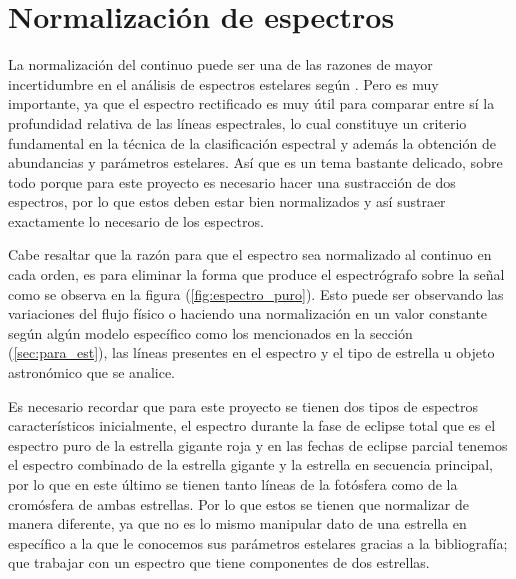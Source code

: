 \documentclass[12pt,oneside,openany,letter]{book}
\begin{document}
\section{Normalización de espectros}\label{sec:normalizacion}

\noindent La normalización del continuo puede ser una de las razones de mayor incertidumbre en el análisis de espectros estelares según \citep{jofre2017gaia}. Pero es muy importante, ya que el espectro rectificado es muy útil para comparar entre sí la profundidad relativa de las líneas espectrales, lo cual constituye un criterio fundamental en la técnica de la clasificación
espectral y además la obtención de abundancias y parámetros estelares. Así que es un tema bastante delicado, sobre todo porque para este proyecto es necesario hacer una sustracción de dos espectros, por lo que estos deben estar bien normalizados y así sustraer exactamente lo necesario de los espectros.
\vspace{2mm}

Cabe resaltar que la razón para que el espectro sea normalizado al continuo en cada orden, es para eliminar la forma que produce el espectrógrafo sobre la señal como se observa en la figura (\ref{fig:espectro_puro}). Esto puede ser observando las variaciones del flujo físico o haciendo una normalización en un valor constante según algún modelo específico como los mencionados en la sección (\ref{sec:para_est}), las líneas presentes en el espectro y el tipo de estrella u objeto astronómico que se analice.


\noindent Es necesario recordar que para este proyecto se tienen dos tipos de espectros característicos inicialmente, el espectro durante la fase de eclipse total que es el espectro puro de la estrella gigante roja y en las fechas de eclipse parcial tenemos el espectro combinado de la estrella gigante y la estrella en secuencia principal, por lo que en este último se tienen tanto líneas de la fotósfera como de la cromósfera de ambas estrellas. Por lo que estos se tienen que normalizar de manera diferente, ya que no es lo mismo manipular dato de una estrella en específico a la que le conocemos sus parámetros estelares gracias a la bibliografía; que trabajar con un espectro que tiene componentes de dos estrellas.


\end{document}
